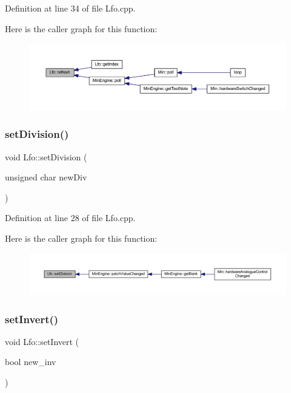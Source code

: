 Definition at line 34 of file Lfo.\+cpp.

Here is the caller graph for this function\+:
\nopagebreak
\begin{figure}[H]
\begin{center}
\leavevmode
\includegraphics[width=350pt]{d6/d5f/class_lfo_a42c8d118df4ecbf3057319b56203133d_icgraph}
\end{center}
\end{figure}
\mbox{\label{class_lfo_a525733f0ed750902b8577b08c0c55023}} 
\subsubsection{\texorpdfstring{set\+Division()}{setDivision()}}
{\footnotesize\ttfamily void Lfo\+::set\+Division (\begin{DoxyParamCaption}\item[{unsigned char}]{new\+Div }\end{DoxyParamCaption})}



Definition at line 28 of file Lfo.\+cpp.

Here is the caller graph for this function\+:
\nopagebreak
\begin{figure}[H]
\begin{center}
\leavevmode
\includegraphics[width=350pt]{d6/d5f/class_lfo_a525733f0ed750902b8577b08c0c55023_icgraph}
\end{center}
\end{figure}
\mbox{\label{class_lfo_ae4f5f170252aabf8d6e44556e587779e}} 
\subsubsection{\texorpdfstring{set\+Invert()}{setInvert()}}
{\footnotesize\ttfamily void Lfo\+::set\+Invert (\begin{DoxyParamCaption}\item[{bool}]{new\+\_\+inv }\end{DoxyParamCaption})\hspace{0.3cm}{\ttfamily [inline]}}



